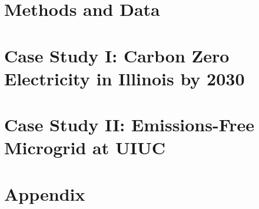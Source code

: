 \documentclass[edeposit,fullpage]{uiucthesis2018}
\begin{document}
\chapter{Methods and Data}


\chapter{Case Study I: Carbon Zero Electricity in Illinois by 2030}

\chapter{Case Study II: Emissions-Free Microgrid at UIUC}

\chapter*{Appendix}


\backmatter



\end{document}
